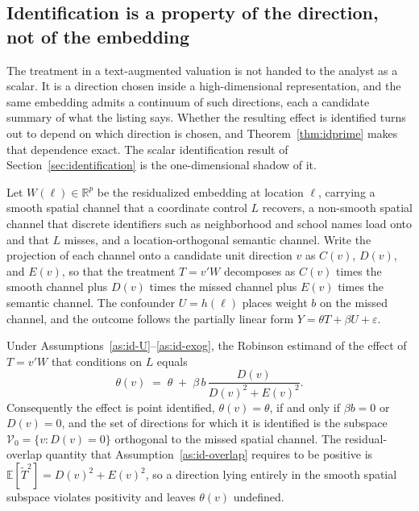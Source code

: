 
\subsection{Identification is a property of the direction, not of the embedding}
\label{sec:thm1prime}

The treatment in a text-augmented valuation is not handed to the analyst as a
scalar. It is a direction chosen inside a high-dimensional representation, and the
same embedding admits a continuum of such directions, each a candidate summary of
what the listing says. Whether the resulting effect is identified turns out to
depend on which direction is chosen, and Theorem~\ref{thm:idprime} makes that
dependence exact. The scalar identification result of
Section~\ref{sec:identification} is the one-dimensional shadow of it.

Let $W(\ell)\in\mathbb{R}^p$ be the residualized embedding at location $\ell$,
carrying a smooth spatial channel that a coordinate control $L$ recovers, a
non-smooth spatial channel that discrete identifiers such as neighborhood and
school names load onto and that $L$ misses, and a location-orthogonal semantic
channel. Write the projection of each channel onto a candidate unit direction $v$
as $C(v)$, $D(v)$, and $E(v)$, so that the treatment $T=v'W$ decomposes as
$C(v)$ times the smooth channel plus $D(v)$ times the missed channel plus $E(v)$
times the semantic channel. The confounder $U=h(\ell)$ places weight $b$ on the
missed channel, and the outcome follows the partially linear form
$Y=\theta T+\beta U+\varepsilon$.

\begin{theorem}
\label{thm:idprime}
Under Assumptions~\ref{as:id-U}--\ref{as:id-exog}, the Robinson estimand of the
effect of $T=v'W$ that conditions on $L$ equals
\begin{equation}
\theta(v)\;=\;\theta\;+\;\beta\,b\,\frac{D(v)}{D(v)^2+E(v)^2}.
\label{eq:thetav}
\end{equation}
Consequently the effect is point identified, $\theta(v)=\theta$, if and only if
$\beta b=0$ or $D(v)=0$, and the set of directions for which it is identified is
the subspace $\mathcal{V}_0=\{v:D(v)=0\}$ orthogonal to the missed spatial channel.
The residual-overlap quantity that Assumption~\ref{as:id-overlap} requires to be
positive is $\mathbb{E}[\tilde T^2]=D(v)^2+E(v)^2$, so a direction lying entirely
in the smooth spatial subspace violates positivity and leaves $\theta(v)$
undefined.
\end{theorem}

